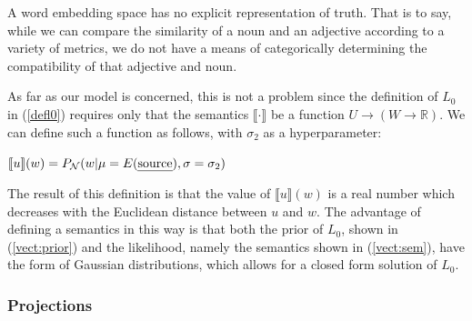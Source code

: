 \documentclass[OpenMind]{stjour}
\newcommand{\Listener}{L}
\newcommand{\QLONE}{\Listener_{{1}}^{{Q}}}
\begin{document}

		A word embedding space has no explicit representation of truth. That is to say, while we can compare the similarity of a noun and an adjective according to a variety of metrics, we do not have a means of categorically determining the compatibility of that adjective and noun.

		As far as our model is concerned, this is not a problem since the definition of $L_0$ in (\ref{defl0}) requires only that the semantics $\llbracket \cdot \rrbracket$ be a function $U\to (W\to \mathbb{R})$. We can define such a function as follows, with $\sigma_2$ as a hyperparameter:
		\vspace{-1.5em}
		\begin{exe}
		\ex $\llbracket u\rrbracket(w) = P_{\mathcal{N}}(w\vert\mu=E(\textrm{\emph{source}}),\sigma=\sigma_2)$ \label{vect:sem}
		\end{exe}





		The result of this definition is that the value of $\llbracket u\rrbracket(w)$ is a real number which decreases with the Euclidean distance between $u$ and $w$. 
		The advantage of defining a semantics in this way is that both the prior of $L_0$, shown in (\ref{vect:prior}) and the likelihood, namely the semantics shown in (\ref{vect:sem}), have the form of Gaussian distributions, which allows for a closed form solution of $L_0$. 

	\subsubsection{Projections} 
\end{document}
